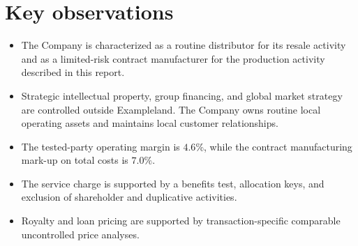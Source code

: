 \section{Key observations}
\begin{itemize}
  \item The Company is characterized as a routine distributor for its resale
    activity and as a limited-risk contract manufacturer for the production
    activity described in this report.
  \item Strategic intellectual property, group financing, and global market
    strategy are controlled outside Exampleland. The Company owns routine local
    operating assets and maintains local customer relationships.
  \item The tested-party operating margin is \(4.6\%\), while the contract
    manufacturing mark-up on total costs is \(7.0\%\).
  \item The service charge is supported by a benefits test, allocation keys,
    and exclusion of shareholder and duplicative activities.
  \item Royalty and loan pricing are supported by transaction-specific
    comparable uncontrolled price analyses.
\end{itemize}
